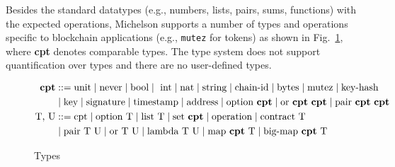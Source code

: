 \documentclass[runningheads]{llncs}
\begin{document}
Besides the standard datatypes (e.g., numbers, lists, pairs, sums, functions) with the expected operations, Michelson supports a number of types and operations specific to blockchain applications (e.g., \texttt{mutez} for tokens) as shown in Fig.~\ref{fig:types}, where \textbf{cpt} denotes comparable types. The type system does not support quantification over types and there are no user-defined types.
\begin{figure}[tp]
\begin{align*}
\textbf{cpt} &::= 
   \text{unit} 
   \mid\text{never} 
   \mid\text{bool} 
   \mid\ \text{int}
   \mid\text{nat}
   \mid\text{string}
   \mid\text{chain-id} 
    \mid\text{bytes}
   \mid\text{mutez} 
   \mid\text{key-hash} \\
   &\mid\text{key}
   \mid \text{signature}
   \mid \text{timestamp} 
   \mid \text{address} 
   \mid \text{option}\ \textbf{cpt}
   \mid \text{or}\ \textbf{cpt}\ \textbf{cpt}
   \mid \text{pair}\ \textbf{cpt}\ \textbf{cpt} \\
\text{T, U} &::= 
    \text{cpt}
   \mid \text{option}\ \text{T}
   \mid \text{list}\ \text{T}
   \mid \text{set}\ \textbf{cpt} 
   \mid \text{operation} 
   \mid \text{contract}\ \text{T} \\
  & \mid \text{pair}\ \text{T}\ \text{U}
   \mid \text{or}\ \text{T}\ \text{U}
   \mid \text{lambda}\ \text{T}\ \text{U} 
   \mid \text{map}\ \textbf{cpt}\ \text{T}
   \mid \text{big-map}\ \textbf{cpt}\ \text{T}
\end{align*}
\caption{Types}
\label{fig:types}
\end{figure}
\end{document}
